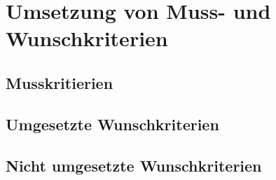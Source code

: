 \section{Umsetzung von Muss- und Wunschkriterien}

\subsection{Musskritierien}

\subsection{Umgesetzte Wunschkriterien}

\subsection{Nicht umgesetzte Wunschkriterien}
